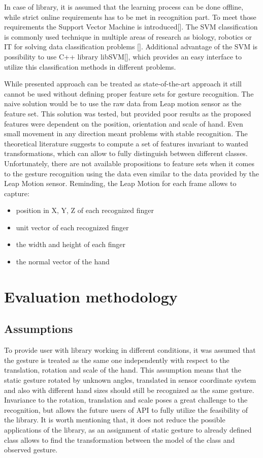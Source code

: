 In case of library, it is assumed that the learning process can be done offline, while strict online requirements has to be met in recognition part. 
To meet those requirements the Support Vector Machine is introduced[]. 
The SVM classification is commonly used technique in multiple areas of research as biology, robotics or IT for solving data classification problems [].
Additional advantage of the SVM is possibility to use C++ library libSVM[], which provides an easy interface to utilize this classification methods in different problems.

While presented approach can be treated as state-of-the-art approach it still cannot be used without defining proper feature sets for gesture recognition.
The naive solution would be to use the raw data from Leap motion sensor as the feature set.
This solution was tested, but provided poor results as the proposed features were dependent on the position, orientation and scale of hand. 
Even small movement in any direction meant problems with stable recognition. 
The theoretical literature suggests to compute a set of features invariant to wanted transformations, which can allow to fully distinguish between different classes.
Unfortunately, there are not available propositions to feature sets when it comes to the gesture recognition using the data even similar to the data provided by the Leap Motion sensor.
Reminding, the Leap Motion for each frame allows to capture:

\begin{itemize}
\item position in X, Y, Z of each recognized finger
\item unit vector of each recognized finger
\item the width and height of each finger
\item the normal vector of the hand
\end{itemize}


\section{Evaluation methodology}

\subsection{Assumptions}
To provide user with library working in different conditions, it was assumed that the gesture is treated as the same one independently with respect to the translation, rotation and scale of the hand. 
This assumption means that the static gesture rotated by unknown angles, translated in sensor coordinate system and also with different hand sizes should still be recognized as the same gesture.
Invariance to the rotation, translation and scale poses a great challenge to the recognition, but allows the future users of API to fully utilize the feasibility of the library.
It is worth mentioning that, it does not reduce the possible applications of the library, as an assignment of static gesture to already defined class allows to find the transformation between the model of the class and observed gesture.


